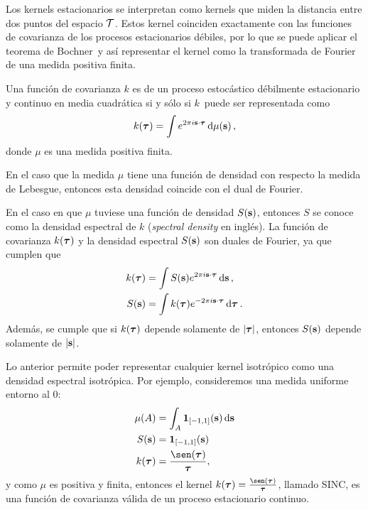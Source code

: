 Los kernels estacionarios se interpretan como kernels que miden la distancia entre dos puntos del espacio \(\mathcal{T}\). Estos kernel coinciden exactamente con las funciones de covarianza de los procesos estacionarios débiles, por lo que se puede aplicar el teorema de Bochner\cite{skorokhod1974theory}\ y así representar el kernel como la transformada de Fourier de una medida positiva finita.

\begin{proposition} Una función de covarianza \(k\) es de un proceso estocástico débilmente estacionario y continuo en media cuadrática si y sólo si \(k\)\ puede ser representada como
	\begin{equation*}
		k(\boldsymbol{\tau}) = \int e^{2\pi i \mathbf{s} \cdot \boldsymbol{\tau} } \dd{\mu(\mathbf{s})},
	\end{equation*}
	donde \(\mu\) es una medida positiva finita.
\end{proposition}

En el caso que la medida \(\mu\) tiene una función de densidad con respecto la medida de Lebesgue, entonces esta densidad coincide con el dual de Fourier.
\begin{proposition}
	En el caso en que \(\mu\) tuviese una función de densidad \(S(\mathbf{s})\), entonces \(S\) se conoce como la densidad espectral de \(k\) (\emph{spectral density} en inglés). La función de covarianza \(k(\boldsymbol{\tau})\) y la densidad espectral \(S(\mathbf{s})\) son duales de Fourier, ya que cumplen que
	\begin{align*}
		k(\boldsymbol{\tau})	&= \int S(\mathbf{s}) e^{2\pi i \mathbf{s} \cdot \boldsymbol{\tau}} \dd{\mathbf{s}}, \\
		S(\mathbf{s})		&= \int k(\boldsymbol{\tau}) e^{-2\pi i \mathbf{s} \cdot \boldsymbol{\tau}} \dd{\boldsymbol{\tau}}.
	\end{align*}
	Además, se cumple que si \(k(\boldsymbol{\tau})\) depende solamente de \(\vert \boldsymbol{\tau} \vert\), entonces \(S(\mathbf{s})\) depende solamente de \(\vert \mathbf{s}\vert\).
\end{proposition}

Lo anterior permite poder representar cualquier kernel isotrópico como una densidad espectral isotrópica. Por ejemplo, consideremos una medida uniforme entorno al \(0\):
\begin{align*}
	\mu (A)		&= \int_{A} \mathbf{1}_{[-1, 1]}(\bfs) \dd{\bfs} \\
	S(\bfs)		&= \mathbf{1}_{[-1, 1]}(\mathbf{s}) \\
	k(\bftau)	&= \frac{\sen(\bftau)}{\bftau},
\end{align*}
y como \(\mu\) es positiva y finita, entonces el kernel \(k(\bftau) = \frac{\sen(\bftau)}{\bftau}\), llamado SINC, es una función de covarianza válida de un proceso estacionario continuo.

